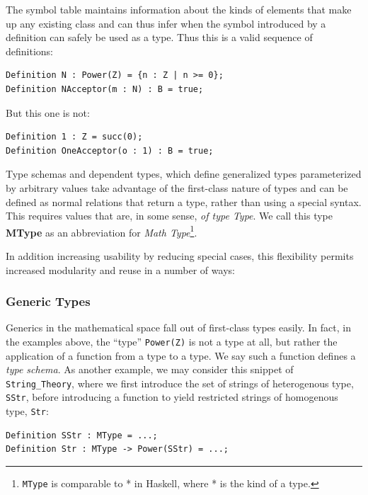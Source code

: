 The symbol table maintains information about the kinds of elements that make up any existing class and can thus infer when the symbol introduced by a definition can safely be used as a type.  Thus this is a valid sequence of definitions:

\begin{lstlisting}
Definition N : Power(Z) = {n : Z | n >= 0};
Definition NAcceptor(m : N) : B = true;
\end{lstlisting}

But this one is not:

\begin{lstlisting}
Definition 1 : Z = succ(0);
Definition OneAcceptor(o : 1) : B = true;
\end{lstlisting}

Type schemas and dependent types, which define generalized types parameterized by arbitrary values take advantage of the first-class nature of types and can be defined as normal relations that return a type, rather than using a special syntax.  This requires values that are, in some sense, \emph{of type Type}.  We call this type \textbf{MType} as an abbreviation for \emph{Math Type}\footnote{\texttt{MType} is comparable to * in Haskell, where * is the kind of a type.}.

In addition increasing usability by reducing special cases, this flexibility permits increased modularity and reuse in a number of ways:

		\subsubsection{Generic Types\label{genericTypes}}

Generics in the mathematical space fall out of first-class types easily.  In fact, in the examples above, the ``type'' \texttt{Power(Z)} is not a type at all, but rather the application of a function from a type to a type.  We say such a function defines a \emph{type schema}.  As another example, we may consider this snippet of \texttt{String\_Theory}, where we first introduce the set of strings of heterogenous type, \texttt{SStr}, before introducing a function to yield restricted strings of homogenous type, \texttt{Str}:

\begin{lstlisting}
Definition SStr : MType = ...;
Definition Str : MType -> Power(SStr) = ...;
\end{lstlisting}

